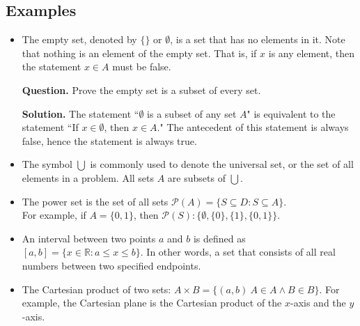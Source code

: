 \documentclass{article}
\begin{document}
\subsection*{Examples}
    \begin{itemize}
        \item  The empty set, denoted by $\{\}$ or $\emptyset$, is a set that has no elements in it. Note that nothing is an element of the empty set. That is, if $x$ is any element, then the statement $x \in A$ must be false. 
        
        \textbf{Question.}
        Prove the empty set is a subset of every set.
        
        \textbf{Solution.}
        The statement ``$\emptyset$ is a subset of any set $A$" is equivalent to the statement ``If $x \in \emptyset$, then $x \in A$." The antecedent of this statement is always false, hence the statement is always true.
        \item The symbol $\bigcup$ is commonly used to denote the universal set, or the set of all elements in a problem. All sets $A$ are subsets of $\bigcup$.
        \item The power set is the set of all sets $\mathcal{P}(A) = \{S \subseteq D : S \subseteq A\}$. \\
        For example, if $A = \{0, 1\}$, then $\mathcal{P}(S): \{\emptyset, \{0\}, \{1\}, \{0, 1\}\}$.
        \item An interval between two points $a$ and $b$ is defined as $[a, b] = \{x \in \mathbb{R} : a \le x \le b\}$. In other words, a set that consists of all real numbers between two specified endpoints.
        \item The Cartesian product of two sets: $A \times B = \{(a, b) \: A \in A \land B \in B\}$. For example, the Cartesian plane is the Cartesian product of the $x$-axis and the $y$-axis.
    \end{itemize}
    
\end{document}
